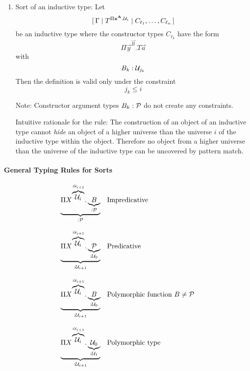 \begin{enumerate}
    \item Sort of an inductive type:
        Let
        $$
        [\,\Gamma
        \mid
        T^{\Pi {\mathbf x} ^{{\mathbf A}}. {\cal U}_i}
        \mid
        C_{\ell_1}, \ldots, C_{\ell_n}
        \,]
        $$
        be an inductive type where the constructor types $C_{\ell_k}$ have the
        form
        $$
        \Pi \vec y^{\vec B}. T \vec a
        $$
        with
        $$
        B_k : {\cal U}_{j_k}
        $$
        Then the definition is valid only under the constraint
        $$
        j_k \le i
        $$

        Note: Constructor argument types $B_k: {\cal P}$ do not create any
        constraints.

        Intuitive rationale for the rule: The construction of an object of an
        inductive type cannot \emph{hide} an object of a higher universe than
        the universe $i$ of the inductive type within the object. Therefore no
        object from a higher universe than the universe of the inductive type
        can be uncovered by pattern match.
\end{enumerate}


\paragraph{General Typing Rules for Sorts}
$$
\begin{array}{ll}
    \underbrace{
        \Pi
        X^{\overbrace{\Any_i}^{: \Any_{i+1}}}
        .
        \underbrace{B}_{: \Prop}
    }_{: \Prop}
    &\text{Impredicative}
    \\
    \\
    \underbrace{
        \Pi
        X^{\overbrace{\Any_i}^{: \Any_{i+1}}}
        .
        \underbrace{\Prop}_{: \Any_0}
    }_{: \Any_{i+1}}
    &\text{Predicative}
    \\
    \\
    \underbrace{
        \Pi
        X^{\overbrace{\Any_i}^{: \Any_{i+1}}}
        .
        \underbrace{B}_{: \Any_0}
    }_{: \Any_{i+1}}
    &\text{Polymorphic function } B \ne \Prop
    \\
    \\
    \underbrace{
        \Pi
        X^{\overbrace{\Any_i}^{: \Any_{i+1}}}
        .
        \underbrace{\Any_0}_{: \Any_1}
    }_{: \Any_{i+1}}
    &\text{Polymorphic type}

\end{array}
$$



